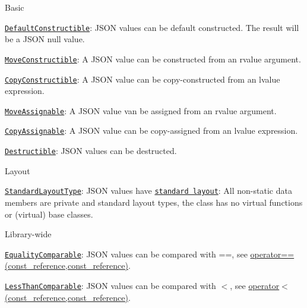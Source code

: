 \begin{DoxyItemize}
\item Basic
\begin{DoxyItemize}
\item \href{https://en.cppreference.com/w/cpp/named_req/DefaultConstructible}{\tt Default\+Constructible}\+: J\+S\+ON values can be default constructed. The result will be a J\+S\+ON null value.
\item \href{https://en.cppreference.com/w/cpp/named_req/MoveConstructible}{\tt Move\+Constructible}\+: A J\+S\+ON value can be constructed from an rvalue argument.
\item \href{https://en.cppreference.com/w/cpp/named_req/CopyConstructible}{\tt Copy\+Constructible}\+: A J\+S\+ON value can be copy-\/constructed from an lvalue expression.
\item \href{https://en.cppreference.com/w/cpp/named_req/MoveAssignable}{\tt Move\+Assignable}\+: A J\+S\+ON value van be assigned from an rvalue argument.
\item \href{https://en.cppreference.com/w/cpp/named_req/CopyAssignable}{\tt Copy\+Assignable}\+: A J\+S\+ON value can be copy-\/assigned from an lvalue expression.
\item \href{https://en.cppreference.com/w/cpp/named_req/Destructible}{\tt Destructible}\+: J\+S\+ON values can be destructed.
\end{DoxyItemize}
\item Layout
\begin{DoxyItemize}
\item \href{https://en.cppreference.com/w/cpp/named_req/StandardLayoutType}{\tt Standard\+Layout\+Type}\+: J\+S\+ON values have \href{https://en.cppreference.com/w/cpp/language/data_members#Standard_layout}{\tt standard layout}\+: All non-\/static data members are private and standard layout types, the class has no virtual functions or (virtual) base classes.
\end{DoxyItemize}
\item Library-\/wide
\begin{DoxyItemize}
\item \href{https://en.cppreference.com/w/cpp/named_req/EqualityComparable}{\tt Equality\+Comparable}\+: J\+S\+ON values can be compared with {\ttfamily ==}, see \hyperlink{classnlohmann_1_1basic__json_a122640e7e2db1814fc7bbb3c122ec76e}{operator==(const\+\_\+reference,const\+\_\+reference)}.
\item \href{https://en.cppreference.com/w/cpp/named_req/LessThanComparable}{\tt Less\+Than\+Comparable}\+: J\+S\+ON values can be compared with {\ttfamily $<$}, see \hyperlink{classnlohmann_1_1basic__json_aacd442b66140c764c594ac8ad7dfd5b3}{operator$<$(const\+\_\+reference,const\+\_\+reference)}.

\end{DoxyItemize}
\end{DoxyItemize}
